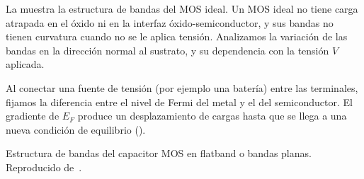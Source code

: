 La  muestra la estructura de bandas del MOS ideal.
Un MOS ideal no tiene carga atrapada en el óxido ni en la interfaz
óxido-semiconductor, y sus bandas no tienen curvatura cuando no se le aplica
tensión.
Analizamos la variación de las bandas en la dirección normal al sustrato,
y su dependencia con la tensión $V$ aplicada.

Al conectar una fuente de tensión 
(por ejemplo una batería)
entre las terminales, 
fijamos la diferencia entre el nivel de Fermi del metal 
y el del semiconductor. 
El gradiente de $E_F$ produce un desplazamiento de cargas hasta que se llega a
una nueva condición de equilibrio ().

%
{Estructura de bandas del capacitor MOS en flatband o bandas planas.
Reproducido de~\cite{sze_physics_2007}.}
